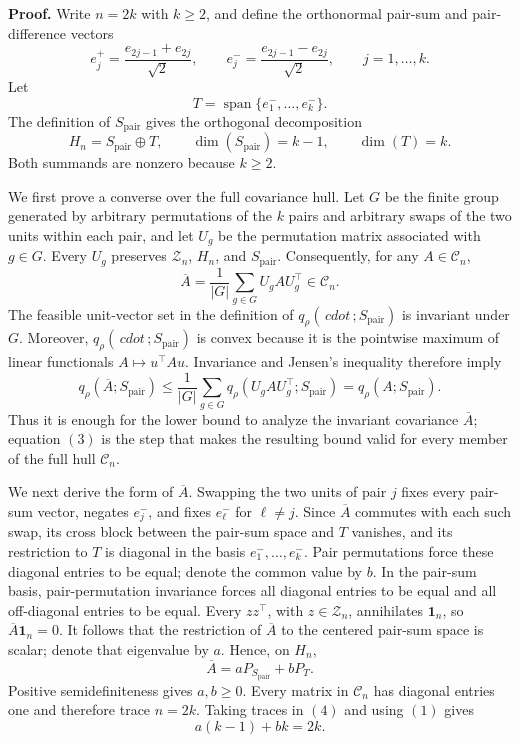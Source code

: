 \textbf{Proof.}
Write \(n=2k\) with \(k\geq 2\), and define the orthonormal pair-sum and pair-difference vectors
\[
e_j^+=\frac{e_{2j-1}+e_{2j}}{\sqrt 2},
\qquad
e_j^-=\frac{e_{2j-1}-e_{2j}}{\sqrt 2},
\qquad j=1,\ldots,k.
\]
Let
\[
T=\operatorname{span}\{e_1^-,\ldots,e_k^-\}.
\]
The definition of \(S_{\mathrm{pair}}\) gives the orthogonal decomposition
\[
H_n=S_{\mathrm{pair}}\mathbin{\oplus}T,
\qquad
\dim(S_{\mathrm{pair}})=k-1,
\qquad
\dim(T)=k.
\tag{1}
\]
Both summands are nonzero because \(k\geq2\).

We first prove a converse over the full covariance hull.  Let \(G\) be the finite group generated by arbitrary permutations of the \(k\) pairs and arbitrary swaps of the two units within each pair, and let \(U_g\) be the permutation matrix associated with \(g\in G\).  Every \(U_g\) preserves \(\mathcal Z_n\), \(H_n\), and \(S_{\mathrm{pair}}\).  Consequently, for any \(A\in\mathcal C_n\),
\[
\overline A=\frac{1}{|G|}\sum_{g\in G}U_gAU_g^\top
\in\mathcal C_n.
\tag{2}
\]
The feasible unit-vector set in the definition of \(q_\rho(\,cdot\,;S_{\mathrm{pair}})\) is invariant under \(G\).  Moreover, \(q_\rho(\,cdot\,;S_{\mathrm{pair}})\) is convex because it is the pointwise maximum of linear functionals \(A\mapsto u^\top Au\).  Invariance and Jensen's inequality therefore imply
\[
q_\rho(\overline A;S_{\mathrm{pair}})
\leq \frac{1}{|G|}\sum_{g\in G}
q_\rho(U_gAU_g^\top;S_{\mathrm{pair}})
=q_\rho(A;S_{\mathrm{pair}}).
\tag{3}
\]
Thus it is enough for the lower bound to analyze the invariant covariance \(\overline A\); equation \((3)\) is the step that makes the resulting bound valid for every member of the full hull \(\mathcal C_n\).

We next derive the form of \(\overline A\).  Swapping the two units of pair \(j\) fixes every pair-sum vector, negates \(e_j^-\), and fixes \(e_\ell^-\) for \(\ell\neq j\).  Since \(\overline A\) commutes with each such swap, its cross block between the pair-sum space and \(T\) vanishes, and its restriction to \(T\) is diagonal in the basis \(e_1^-,\ldots,e_k^-\).  Pair permutations force these diagonal entries to be equal; denote the common value by \(b\).  In the pair-sum basis, pair-permutation invariance forces all diagonal entries to be equal and all off-diagonal entries to be equal.  Every \(zz^\top\), with \(z\in\mathcal Z_n\), annihilates \(\mathbf 1_n\), so \(\overline A\mathbf 1_n=0\).  It follows that the restriction of \(\overline A\) to the centered pair-sum space is scalar; denote that eigenvalue by \(a\).  Hence, on \(H_n\),
\[
\overline A=aP_{S_{\mathrm{pair}}}+bP_T.
\tag{4}
\]
Positive semidefiniteness gives \(a,b\geq0\).  Every matrix in \(\mathcal C_n\) has diagonal entries one and therefore trace \(n=2k\).  Taking traces in \((4)\) and using \((1)\) gives
\[
a(k-1)+bk=2k.
\tag{5}
\]

